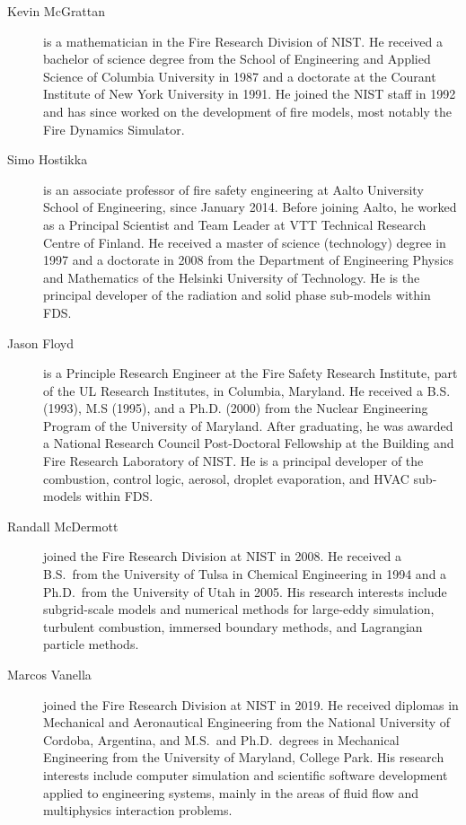 \begin{description}

\item[Kevin McGrattan] is a mathematician in the Fire Research Division of NIST. He received a bachelor of science degree from the School of Engineering and Applied Science of Columbia University in 1987 and a doctorate at the Courant Institute of New York University in 1991. He joined the NIST staff in 1992 and has since worked on the development of fire models, most notably the Fire Dynamics Simulator.

\item[Simo Hostikka] is an associate professor of fire safety engineering at Aalto University School of Engineering, since January 2014. Before joining Aalto, he worked as a Principal Scientist and Team Leader at VTT Technical Research Centre of Finland. He received a master of science (technology) degree in 1997 and a doctorate in 2008 from the Department of Engineering Physics and Mathematics of the Helsinki University of Technology.  He is the principal developer of the radiation and solid phase sub-models within FDS.

\item[Jason Floyd] is a Principle Research Engineer at the Fire Safety Research Institute, part of the UL Research Institutes, in Columbia, Maryland. He received a B.S. (1993), M.S (1995), and a Ph.D. (2000) from the Nuclear Engineering Program of the University of Maryland. After graduating, he was awarded a National Research Council Post-Doctoral Fellowship at the Building and Fire Research Laboratory of NIST. He is a principal developer of the combustion, control logic, aerosol, droplet evaporation, and HVAC sub-models within FDS.

\item[Randall McDermott] joined the Fire Research Division at NIST in 2008. He received a B.S.~from the University of Tulsa in Chemical Engineering in 1994 and a Ph.D.~from the University of Utah in 2005. His research interests include subgrid-scale models and numerical methods for large-eddy simulation, turbulent combustion, immersed boundary methods, and Lagrangian particle methods.

\item[Marcos Vanella] joined the Fire Research Division at NIST in 2019. He received diplomas in Mechanical and Aeronautical Engineering from the National University of Cordoba, Argentina, and M.S.~and Ph.D.~degrees in Mechanical Engineering from the University of Maryland, College Park. His research interests include computer simulation and scientific software development applied to engineering systems, mainly in the areas of fluid flow and multiphysics interaction problems.


\end{description}
